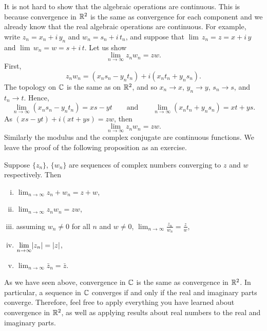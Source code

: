 It is not hard to show that the algebraic operations are
continuous.  This is because convergence in 
${\mathbb{R}}^2$ is the same as convergence for each component and we already know
that the real algebraic operations are continuous.  For example,
write $z_n = x_n + i\,y_n$ and
$w_n = s_n + i\,t_n$, and suppose that
$\lim \, z_n = z = x+i\,y$ and $\lim \, w_n = w = s+i\,t$.
Let us show
\begin{equation*}
\lim_{n\to\infty} z_n w_n = zw .
\end{equation*}
First,
\begin{equation*}
z_n w_n = (x_ns_n-y_nt_n) + i(x_nt_n+y_ns_n) .
\end{equation*}
The topology on ${\mathbb{C}}$ is the same as on ${\mathbb{R}}^2$, and so
$x_n \to x$, $y_n \to y$, $s_n \to s$, and $t_n \to t$.
Hence,
\begin{equation*}
\lim_{n\to\infty} (x_ns_n-y_nt_n) = xs-yt \qquad \text{and} \qquad
\lim_{n\to\infty} (x_nt_n+y_ns_n) = xt+ys .
\end{equation*}
As
$(xs-yt)+i(xt+ys) = zw$, then
\begin{equation*}
\lim_{n\to\infty} z_n w_n = zw .
\end{equation*}
Similarly the modulus and the complex conjugate are continuous functions.  We
leave the proof of the following proposition as an exercise.

\begin{prop} \label{prop:continuityofcomplex}
Suppose $\{ z_n \}$, $\{ w_n \}$ are sequences of complex numbers converging
to $z$ and $w$ respectively.  Then
\begin{enumerate}[(i)]
\item
$\displaystyle \lim_{n\to \infty} z_n + w_n = z + w$,
\item
$\displaystyle \lim_{n\to \infty} z_n w_n = z w$,
\item
assuming $w_n \not= 0$ for all $n$ and $w\not= 0$,
$\displaystyle \lim_{n\to \infty} \frac{z_n}{w_n} = \frac{z}{w}$,
\item
$\displaystyle \lim_{n\to \infty} \lvert {z_n} \rvert = \lvert {z} \rvert$,
\item
$\displaystyle \lim_{n\to \infty} \bar{z}_n = \bar{z}$.
\end{enumerate}
\end{prop}

As we have seen above, convergence in ${\mathbb{C}}$ is the same as convergence in
${\mathbb{R}}^2$.  In particular, a sequence in ${\mathbb{C}}$ converges if and only if
the real and imaginary parts converge.  Therefore, feel free to apply
everything you have learned about convergence in ${\mathbb{R}}^2$, as well as
applying results about real numbers to the real and imaginary parts.

